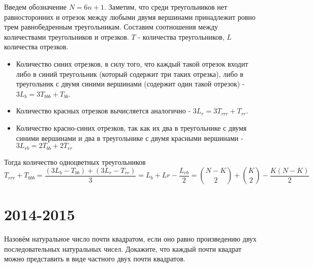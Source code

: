 \documentclass[11pt, a4paper]{template}
\begin{document}
\begin{solution}
Введем обозначение $N = 6n + 1$. Заметим, что среди треугольников нет равносторонних и отрезок между любыми двумя вершинами принадлежит ровно трем равнобедренным треугольникам. Составим соотношения между количествами треугольников и отрезков. $T$ - количества треугольников, $L$  количества отрезков.
\begin{itemize}
\item Количество синих отрезков, в силу того, что каждый такой отрезок входит либо в синий треугольник (который содержит три таких отрезка), либо в треугольник с двумя синими вершинами (содержит один такой отрезок) - $3L_{b} = 3 T_{bbb} + T_{bb}$.
\item Количество красных отрезков вычисляется аналогично - $3L_{r} = 3T_{rrr} + T_{rr}$.
\item Количество красно-синих отрезков, так как их два в треугольнике с двумя синими вершинами и два в треугольнике с двумя красными вершинами - $3L_{rb} = 2T_{bb}+2T_{rr}$
\end{itemize}
Тогда количество одноцветных треугольников
$$
T_{rrr} + T_{bbb} = \frac{(3L_{b} - T_{bb}) + (3L_{r} - T_{rr})}{3} = L_{b} + L{r} - \frac{L_{rb}}{2} = \binom{N - K}{2} + \binom{K}{2} - \frac{K(N - K)}{2}
$$
\end{solution}

\chapter{2014-2015}

\begin{exercise}
Назовём натуральное число почти квадратом, если оно равно произведению двух последовательных натуральных чисел. Докажите, что каждый почти квадрат можно представить в виде частного двух почти квадратов.
\end{exercise}
\end{document}
